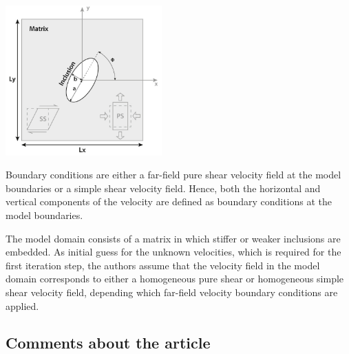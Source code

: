 \begin{center}
\includegraphics[width=6cm]{python_codes/fieldstone_142/images/hams22_a}\\
\end{center}

Boundary conditions are either a far-field pure shear velocity field at the model boundaries
or a simple shear velocity field.
Hence, both the horizontal and vertical components of the velocity are defined as
boundary conditions at the model boundaries.

The model domain consists of a matrix in which stiffer or weaker inclusions are embedded. As
initial guess for the unknown velocities, which is required for the first
iteration step, the authors assume that the velocity field in the model domain
corresponds to either a homogeneous pure shear or homogeneous simple
shear velocity field, depending which far-field velocity boundary conditions are applied. 

\subsection*{Comments about the article}


